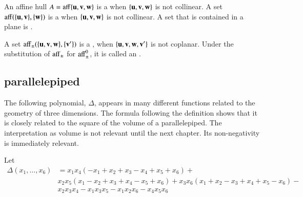 \begin{definition}\label{def:plane}	
An affine hull $A={\operatorname{aff}}\{{\mathbf u},{\mathbf v},{\mathbf w}\}$ is a  when $\{{\mathbf u},{\mathbf v},{\mathbf w}\}$ is not collinear.   A set ${\operatorname{aff}}(\{{\mathbf u},{\mathbf v}\},\{{\mathbf w}\})$
is a  when $\{{\mathbf u},{\mathbf v},{\mathbf w}\}$ is not collinear. A set that is contained in a plane is  .
\end{definition}
%
%
%
%


\begin{definition} A set ${\operatorname{aff}}_{\pm}(\{{\mathbf u},{\mathbf v},{\mathbf w}\},\{{\mathbf v}'\})$ is a ,
when $\{{\mathbf u},{\mathbf v},{\mathbf w},{\mathbf v}'\}$ is not coplanar.  Under the substitution of
${\operatorname{aff}}_{\pm}$ for ${\operatorname{aff}}_{\pm}^0$, it is called an
.
\end{definition}
%
%

\subsection{parallelepiped}\label{sec:piped}
%



The following polynomial, $\Delta$,  appears in many different functions related to the geometry of three dimensions.  The formula following the definition shows that it is closely related to the square of the volume of a parallelepiped.  The interpretation as  volume is not relevant until the next chapter.  Its non-negativity is immediately relevant. 
%

\begin{definition}[$\Delta$]\label{def:delta}  Let 
$$
\begin{array}{lll}
\Delta(x_1,\ldots,x_6) &= x_1 x_4 (- x_1+x_2+x_3- x_4+x_5+x_6)+\\&
            x_2 x_5 (x_1- x_2+x_3+x_4- x_5+x_6)
            +x_3 x_6 (x_1+x_2- x_3+x_4+x_5- x_6)
            - \\&x_2 x_3 x_4- x_1 x_3 x_5- x_1 x_2 x_6- x_4 x_5 x_6
\end{array}
$$
\end{definition}
%
%

